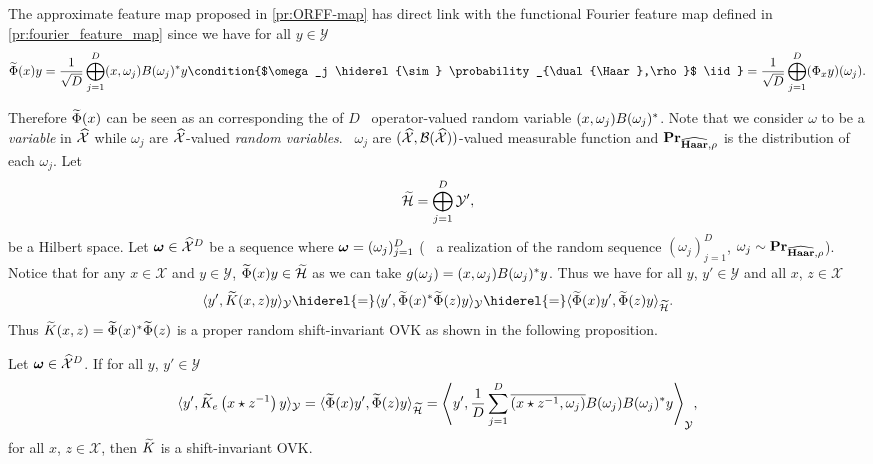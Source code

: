 \begin{remark}
The approximate feature map proposed in \cref{pr:ORFF-map} has direct link with the functional Fourier feature map defined in \cref{pr:fourier_feature_map} since we have for all $y\in\mathcal{Y}$
\begin{dmath}
\tildePhi{\omega}(x)y = \frac{1}{\sqrt{D}}\Vect_{j=1}^D\pairing{x, \omega_j}B(\omega_j)^\adjoint y \condition{$\omega_j \hiderel{\sim} \probability_{\dual{\Haar},\rho}$ \iid}
= \frac{1}{\sqrt{D}} \Vect_{j=1}^D (\Phi_x y)(\omega_j).
\end{dmath}
\end{remark}
Therefore $\widetilde{\Phi}(x)$ can be seen as an  corresponding the  of $D$ \iid~operator-valued random variable $(x, \omega_j)B(\omega_j)^*$. Note that we consider $\omega$ to be a \emph{variable} in $\widehat{\mathcal{X}}$ while $\omega_j$ are $\widehat{\mathcal{X}}$-valued \emph{random variables}. \Ie~$\omega_j$ are $(\widehat{\mathcal{X}}, \mathcal{B}(\widehat{\mathcal{X}}))$-valued measurable function and ${\mathbf{{Pr}}}_{\widehat{\mathbf{Haar}},\rho}$ is the distribution of each $\omega_j$. Let
\begin{dmath*}
\tildeH{\omega} = \Vect_{j=1}^D\mathcal{Y}',
\end{dmath*}
be a Hilbert space. Let $\boldsymbol{\mathbf{\omega}}\in\widehat{\mathcal{X}}^D$ be a sequence where $\boldsymbol{\mathbf{\omega}}=(\omega_j)_{j=1}^D$ (\ie~ a realization of the random sequence $(\omega_j)_{j=1}^D$, $\omega_j \sim {\mathbf{{Pr}}}_{\widehat{\mathbf{Haar}},\rho}$). Notice that for any $x\in\mathcal{X}$ and $y\in\mathcal{Y}$, $\widetilde{\Phi}(x)y\in\widetilde{\mathcal{H}}$ as we can take $g(\omega_j)=(x,\omega_j)B(\omega_j)^* y$. Thus we have for all $y$, $y'\in\mathcal{Y}$ and all $x$, $z\in\mathcal{X}$
\begin{dmath*}
\inner{y', \tildeK{\omega}(x, z)y}_{\mathcal{Y}} \hiderel{=} \inner{y', \tildePhi{\omega}(x)^\adjoint \tildePhi{\omega}(z)y}_{\mathcal{Y}} \hiderel{=} \inner{\tildePhi{\omega}(x)y', \tildePhi{\omega}(z)y}_{\tildeH{\omega}}.
\end{dmath*}
Thus $\widetilde{K}(x,z)=\widetilde{\Phi}(x)^* \widetilde{\Phi}(z)$ is a proper random shift-invariant \acl{OVK} as shown in the following proposition.
\begin{proposition} Let $\boldsymbol{\mathbf{\omega}}\in\widehat{\mathcal{X}}^D$. If for all $y$, $y'\in\mathcal{Y}$
\begin{dmath*}
\inner{y', \tildeK{\omega}_e\left(x\groupop z^{-1}\right)y}_{\mathcal{Y}}=\inner{\tildePhi{\omega}(x)y', \tildePhi{\omega}(z)y}_{\tildeH{\omega}}
=\inner*{y', \frac{1}{D}\sum_{j=1}^D \conj{\pairing{x\groupop z^{-1},\omega_j}}B(\omega_j)B(\omega_j)^*y}_{\mathcal{Y}},
\end{dmath*}
for all $x$,  $z\in\mathcal{X}$, then $\widetilde{K}$ is a shift-invariant \acl{OVK}.
\end{proposition}
